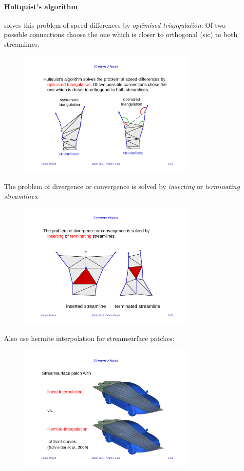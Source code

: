 \paragraph{Hultquist's algorithm} solves this problem of speed differences by \emph{optimised triangulation}: Of two possible connections choose the one which is closer to orthogonal (sic) to both streamlines.
\begin{figure}[H]
    \centering
    \includegraphics[width=0.8\textwidth]{img/05_hultquist}
\end{figure}
The problem of divergence or convergence is solved by \emph{inserting} or \emph{terminating streamlines}.
\begin{figure}[H]
    \centering
    \includegraphics[width=0.8\textwidth]{img/05_hultquist_divergence}
\end{figure}

Also use hermite interpolation for streamsurface patches:
\begin{figure}[H]
    \centering
    \includegraphics[width=0.8\textwidth]{img/05_hultquist_interpolation}
\end{figure}

